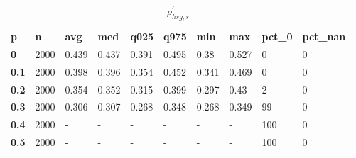 \begin{table}[h]
 \centering 
\footnotesize
\caption{$\rho_{hsg,s}^\prime $}
\label{tab:alphahsgs}
\begin{tabular}[h]{| l l l l l l l l l l|
    } \hline
\textbf{ p} & \textbf{ n} & \textbf{ avg} & \textbf{ med} & \textbf{ q025} & \textbf{ q975} & \textbf{ min} & \textbf{ max} & \textbf{ pct\_0} & \textbf{ pct\_nan}
           \\
  \textbf{  0} & 2000 & 0.439 & 0.437 & 0.391 & 0.495 &  0.38 & 0.527 &   0 & 0
           \\
  \textbf{0.1} & 2000 & 0.398 & 0.396 & 0.354 & 0.452 & 0.341 & 0.469 &   0 & 0
           \\
  \textbf{0.2} & 2000 & 0.354 & 0.352 & 0.315 & 0.399 & 0.297 &  0.43 &   2 & 0
           \\
  \textbf{0.3} & 2000 & 0.306 & 0.307 & 0.268 & 0.348 & 0.268 & 0.349 &  99 & 0
           \\
  \textbf{0.4} & 2000 & - & - & - & - & - & - & 100 & 0
           \\
  \textbf{0.5} & 2000 & - & - & - & - & - & - & 100 & 0
           \\
 \hline \end{tabular}
 \end{table}
